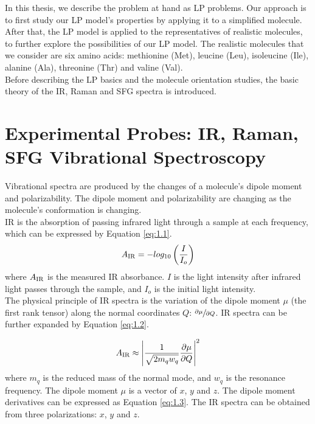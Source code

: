 In this thesis, we describe the problem at hand as LP problems. Our approach is to first study our LP model's properties by applying it to a simplified molecule. After that, the LP model is applied to the representatives of realistic molecules, to further explore the possibilities of our LP model. The realistic molecules that we consider are six amino acids: methionine (Met), leucine (Leu), isoleucine (Ile), alanine (Ala), threonine (Thr) and valine (Val).\\

Before describing the LP basics and the molecule orientation studies, the basic theory of  the IR, Raman and SFG spectra is introduced.\\

\section{Experimental Probes: IR, Raman, SFG Vibrational Spectroscopy}
Vibrational spectra are produced by the changes of a molecule's dipole moment and polarizability. The dipole moment and polarizability are changing as the molecule's conformation is changing. \\

IR is the absorption of passing infrared light through a sample at each frequency, which can be expressed by Equation \ref{eq:1.1}. \\

\begin{equation} \label{eq:1.1}
A_{\rm IR} = - log_{10} \left( \frac{I}{I_{o}} \right)
\end{equation}
where $A_{\rm IR}$ is the measured IR absorbance. $I$ is the light intensity after infrared light passes through the sample, and $I_{o}$ is the initial light intensity. \\

The physical principle of IR spectra is the variation of the dipole moment $\mu$ (the first rank tensor) along the normal coordinates $Q$: $\sfrac{\partial\mu}{\partial Q}$. IR spectra can be further expanded by Equation \ref{eq:1.2}.

\begin{equation} \label{eq:1.2}
A_{\rm IR} \approx \left| \frac{1}{\sqrt{2m_{q}w_{q}}} \frac{\partial\mu}{\partial Q} \right|^{2}
\end{equation}
where $m_{q}$ is the reduced mass of the normal mode, and $w_{q}$ is the resonance frequency. The dipole moment $\mu$ is a vector of $x$, $y$ and $z$. The dipole moment derivatives can be expressed as Equation \ref{eq:1.3}. The IR spectra can be obtained from three polarizations: $x$, $y$ and $z$. \\

